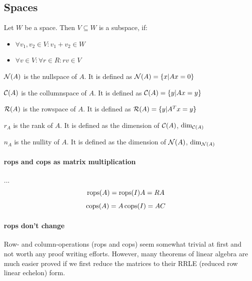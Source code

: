 \subsection{Spaces}

\begin{definition}
    Let $W$ be a space. Then $V \subseteq W$ is a subspace, if: 
    \begin{itemize}
        \item $\forall v_1, v_2 \in V: v_1 + v_2 \in W$
        \item $\forall v \in V: \forall r \in R: rv \in V$
    \end{itemize}
\end{definition}
    

\begin{definition}[Nullspace]
     $\mathcal{N}(A)$ is the nullspace of $A$. It is defined as $\mathcal{N}(A) = \{ x | Ax = 0 \}$
\end{definition}

\begin{definition}[Columnspace]
     $\mathcal{C}(A)$ is the collumnspace of $A$. It is defined as $\mathcal{C}(A) = \{ y | Ax = y \}$
\end{definition}

\begin{definition}[Rowspace]
     $\mathcal{R}(A)$ is the rowspace of $A$. It is defined as $\mathcal{R}(A) = \{ y | A^Tx = y \}$
\end{definition}

\begin{definition}[Rank]
     $r_A$ is the rank of $A$. It is defined as the dimension of $\mathcal{C}(A)$, $\text{dim}_{\mathcal{C}(A)}$
\end{definition}

\begin{definition}[Nullity]
    $n_A$ is the nullity of $A$. It is defined as the dimension of $\mathcal{N}(A)$, $\text{dim}_{\mathcal{N}(A)}$
\end{definition}


\paragraph{rops and cops as matrix multiplication} ...
$$ \operatorname{rops}(A) = \operatorname{rops}(I) A = R A$$
$$ \operatorname{cops}(A) = A \operatorname{cops}(I) = A C$$

\paragraph{rops don't change }
Row- and column-operations (rops and cops) seem somewhat trivial at first and not worth any proof writing efforts. However, many theorems of linear algebra are much easier proved if we first reduce the matrices to their RRLE (reduced row linear echelon) form.

